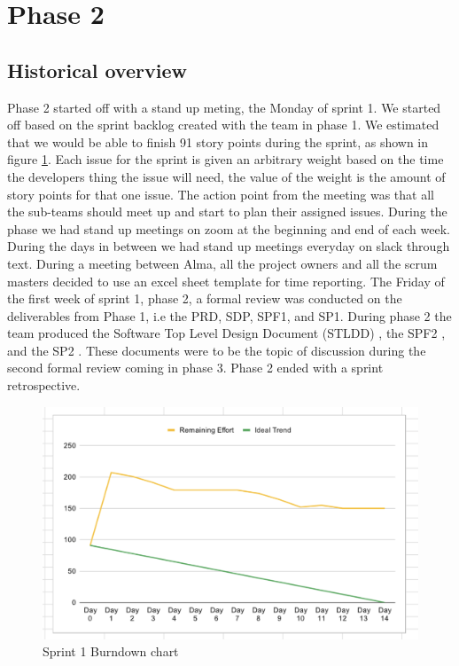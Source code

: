 \documentclass{article}
\begin{document}
\section{Phase 2} %
\subsection{Historical overview}
Phase 2 started off with a stand up meting, the Monday of sprint 1. We started off based on the sprint backlog created with the team in phase 1. We estimated that we would be able to finish 91 story points during the sprint, as shown in figure \ref{fig:Burndown1}. Each issue for the sprint is given an arbitrary weight based on the time the developers thing the issue will need, the value of the weight is the amount of story points for that one issue. The action point from the meeting was that all the sub-teams should meet up and start to plan their assigned issues. During the phase we had stand up meetings on zoom at the beginning and end of each week. During the days in between we had stand up meetings everyday on slack through text. During a meeting between Alma, all the project owners and all the scrum masters decided to use an excel sheet template for time reporting. The Friday of the first week of  sprint 1, phase 2, a formal review was conducted on the deliverables from Phase 1, i.e the PRD, SDP, SPF1, and SP1. During phase 2 the team produced the Software Top Level Design Document (STLDD) \cite{STLDD}, the SPF2 \cite{SPF2}, and the SP2 \cite{SP2}. These documents were to be the topic of discussion during the second formal review coming in phase 3. Phase 2 ended with a sprint retrospective.

\begin{figure}[h!]
    \centering
    \includegraphics[scale=0.6]{pfrFigures/Sprint1.png}
    \caption{Sprint 1 Burndown chart}
    \label{fig:Burndown1}
\end{figure}
\end{document}
